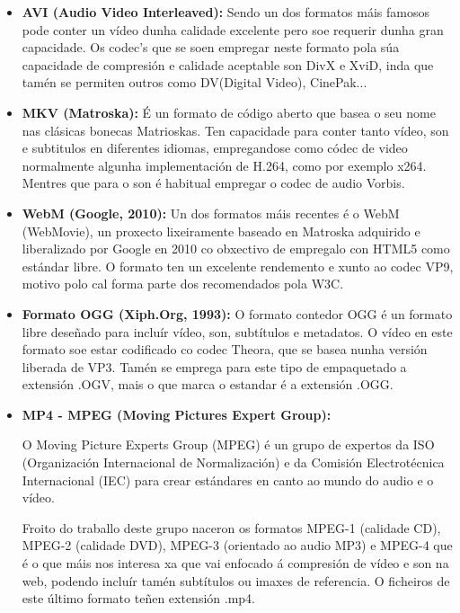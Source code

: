         \begin{itemize}
        \item \textbf{AVI (Audio Video Interleaved):} 
            Sendo un dos formatos máis famosos pode conter un vídeo dunha calidade excelente pero
            soe requerir dunha gran capacidade. Os codec's que se soen empregar neste formato pola 
            súa capacidade de compresión e calidade aceptable son DivX e XviD, inda que tamén se 
            permiten outros como DV(Digital Video), CinePak... 
            
        \item \textbf{MKV (Matroska):}
            É un formato de código aberto que basea o seu nome nas clásicas bonecas Matrioskas. Ten
            capacidade para conter tanto vídeo, son e subtitulos en diferentes idiomas, empregandose
            como códec de video normalmente algunha implementación de H.264, como por exemplo x264. 
            Mentres que para o son é habitual empregar o codec de audio Vorbis.

        \item \textbf{ WebM (Google, 2010):}
            Un dos formatos máis recentes é o WebM (WebMovie), un proxecto lixeiramente baseado en 
            Matroska adquirido e liberalizado por Google en 2010 co obxectivo de empregalo con HTML5
            como estándar libre. O formato ten un excelente rendemento e xunto ao codec VP9, motivo
            polo cal forma parte dos recomendados pola W3C.
            
        \item \textbf{Formato OGG (Xiph.Org, 1993):} 
            O formato contedor OGG é un formato libre deseñado para incluír vídeo, son, 
            subtítulos e metadatos. O vídeo en este formato soe estar codificado co codec Theora, 
            que se basea nunha versión liberada de VP3. Tamén se emprega para este tipo de 
            empaquetado a extensión .OGV, mais o que marca o estandar é a extensión .OGG.  
            
        \item \textbf{MP4 - MPEG (Moving Pictures Expert Group):}
        
        O  Moving Picture Experts Group (MPEG) é un grupo de expertos da ISO (Organización 
        Internacional de Normalización) e da Comisión Electrotécnica Internacional (IEC) para
        crear estándares en canto ao mundo do audio e o vídeo.
        
        Froito do traballo deste grupo naceron os formatos MPEG-1 (calidade CD), MPEG-2 (calidade 
        DVD), MPEG-3 (orientado ao audio MP3) e MPEG-4 que é o que máis nos interesa xa que vai 
        enfocado á compresión de vídeo e son na web, podendo incluír tamén subtítulos ou imaxes de 
        referencia. O ficheiros de este último formato teñen extensión .mp4.

        \end{itemize}



